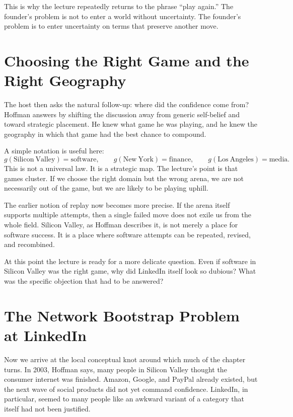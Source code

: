 This is why the lecture repeatedly returns to the phrase ``play again.'' The founder's problem is not to enter a world without uncertainty. The founder's problem is to enter uncertainty on terms that preserve another move.

\section{Choosing the Right Game and the Right Geography}

The host then asks the natural follow-up: where did the confidence come from? Hoffman answers by shifting the discussion away from generic self-belief and toward strategic placement. He knew what game he was playing, and he knew the geography in which that game had the best chance to compound.

A simple notation is useful here:
\begin{equation}
g(\mathrm{Silicon\ Valley})=\mathrm{software}, \qquad
g(\mathrm{New\ York})=\mathrm{finance}, \qquad
g(\mathrm{Los\ Angeles})=\mathrm{media}.
\end{equation}
This is not a universal law. It is a strategic map. The lecture's point is that games cluster. If we choose the right domain but the wrong arena, we are not necessarily out of the game, but we are likely to be playing uphill.

The earlier notion of replay now becomes more precise. If the arena itself supports multiple attempts, then a single failed move does not exile us from the whole field. Silicon Valley, as Hoffman describes it, is not merely a place for software success. It is a place where software attempts can be repeated, revised, and recombined.

At this point the lecture is ready for a more delicate question. Even if software in Silicon Valley was the right game, why did LinkedIn itself look so dubious? What was the specific objection that had to be answered?

\section{The Network Bootstrap Problem at LinkedIn}

Now we arrive at the local conceptual knot around which much of the chapter turns. In 2003, Hoffman says, many people in Silicon Valley thought the consumer internet was finished. Amazon, Google, and PayPal already existed, but the next wave of social products did not yet command confidence. LinkedIn, in particular, seemed to many people like an awkward variant of a category that itself had not been justified.

